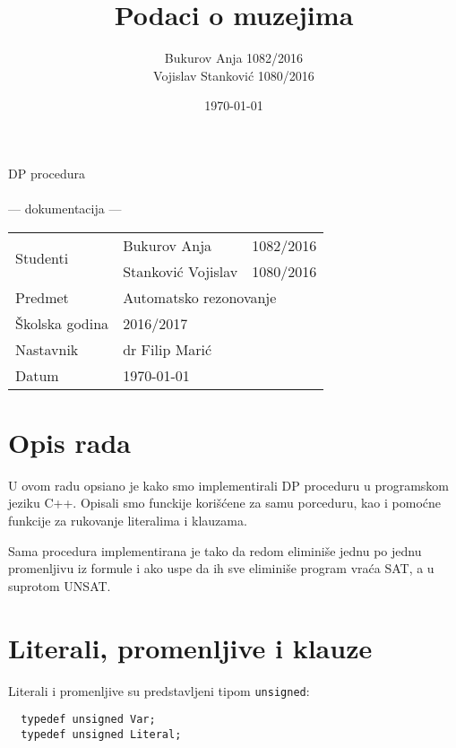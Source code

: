 \documentclass[a4paper, 12pt]{article}
\author{Bukurov Anja 1082/2016\\Vojislav Stanković 1080/2016}
\title{Podaci o muzejima}
\date{\today}
\begin{document}
\begin{titlepage}
	\centering
	
	\vspace{0.3\textheight}
	
	{\Huge DP procedura}
	\\~
	\\
	{\Large — dokumentacija —}
	
	\vfill
	
	{
		\Large 
		\begin{tabular}{|l|l|l|}
			\hline
			\multirow{2}{*}{Studenti} & Bukurov Anja        & 1082/2016\\ \cline{2-3}
			                          & Stanković Vojislav 	& 1080/2016\\
			\hline
			Predmet                   & \multicolumn{2}{l|}{Automatsko rezonovanje}\\
			\hline
			Školska godina         & \multicolumn{2}{l|}{2016/2017}\\
			\hline
			Nastavnik                 & \multicolumn{2}{l|}{dr Filip Marić}\\
			\hline
			Datum                     & \multicolumn{2}{l|}{\today}\\
			\hline
		\end{tabular}
	}
\end{titlepage}
\newpage

\section{Opis rada}

U ovom radu opsiano je kako smo implementirali DP proceduru u programskom jeziku C++. Opisali smo funckije korišćene za samu porceduru, kao i pomoćne funkcije za rukovanje literalima i klauzama.

Sama procedura implementirana je tako da redom eliminiše jednu po jednu promenljivu iz formule i ako uspe da ih sve eliminiše program vraća SAT, a u suprotom UNSAT.


\section{Literali, promenljive i klauze}

\noindent Literali i promenljive su predstavljeni tipom \verb|unsigned|:

\begin{verbatim}
  typedef unsigned Var;
  typedef unsigned Literal;
\end{verbatim}
\end{document}
